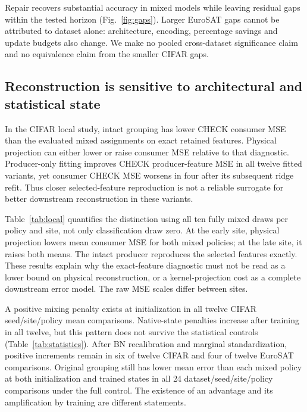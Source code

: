 \documentclass[conference,letterpaper,10pt]{IEEEtran}
\begin{document}
Repair recovers substantial accuracy in mixed models while leaving residual gaps within the tested horizon (Fig.~\ref{fig:gaps}). Larger EuroSAT gaps cannot be attributed to dataset alone: architecture, encoding, percentage savings and update budgets also change. We make no pooled cross-dataset significance claim and no equivalence claim from the smaller CIFAR gaps.

\subsection{Reconstruction is sensitive to architectural and statistical state}
In the CIFAR local study, intact grouping has lower CHECK consumer MSE than the evaluated mixed assignments on exact retained features. Physical projection can either lower or raise consumer MSE relative to that diagnostic. Producer-only fitting improves CHECK producer-feature MSE in all twelve fitted variants, yet consumer CHECK MSE worsens in four after its subsequent ridge refit. Thus closer selected-feature reproduction is not a reliable surrogate for better downstream reconstruction in these variants.


Table~\ref{tab:local} quantifies the distinction using all ten fully mixed draws per policy and site, not only classification draw zero. At the early site, physical projection lowers mean consumer MSE for both mixed policies; at the late site, it raises both means. The intact producer reproduces the selected features exactly. These results explain why the exact-feature diagnostic must not be read as a lower bound on physical reconstruction, or a kernel-projection cost as a complete downstream error model. The raw MSE scales differ between sites.

A positive mixing penalty exists at initialization in all twelve CIFAR seed/site/policy mean comparisons. Native-state penalties increase after training in all twelve, but this pattern does not survive the statistical controls (Table~\ref{tab:statistics}). After BN recalibration and marginal standardization, positive increments remain in six of twelve CIFAR and four of twelve EuroSAT comparisons. Original grouping still has lower mean error than each mixed policy at both initialization and trained states in all 24 dataset/seed/site/policy comparisons under the full control. The existence of an advantage and its amplification by training are different statements.

\end{document}
